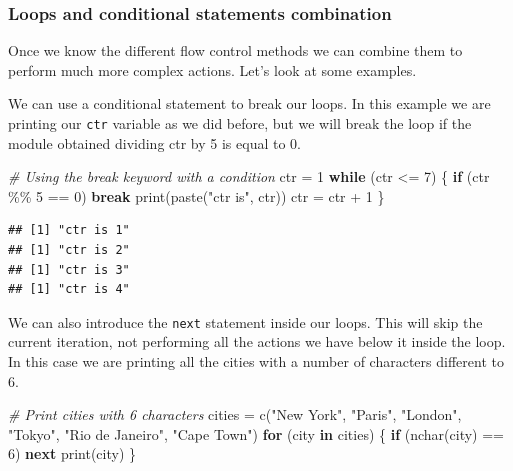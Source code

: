 \documentclass[
]{book}
\newenvironment{Shaded}{\begin{snugshade}}{\end{snugshade}}
\newcommand{\CommentTok}[1]{\textcolor[rgb]{0.56,0.35,0.01}{\textit{#1}}}
\newcommand{\ControlFlowTok}[1]{\textcolor[rgb]{0.13,0.29,0.53}{\textbf{#1}}}
\newcommand{\DecValTok}[1]{\textcolor[rgb]{0.00,0.00,0.81}{#1}}
\newcommand{\FunctionTok}[1]{\textcolor[rgb]{0.00,0.00,0.00}{#1}}
\newcommand{\NormalTok}[1]{#1}
\newcommand{\OtherTok}[1]{\textcolor[rgb]{0.56,0.35,0.01}{#1}}
\newcommand{\SpecialCharTok}[1]{\textcolor[rgb]{0.00,0.00,0.00}{#1}}
\newcommand{\StringTok}[1]{\textcolor[rgb]{0.31,0.60,0.02}{#1}}
\begin{document}
\hypertarget{loops-and-conditional-statements-combination}{%
\subsubsection{Loops and conditional statements combination}\label{loops-and-conditional-statements-combination}}

Once we know the different flow control methods we can combine them to perform much more complex actions. Let's look at some examples.

We can use a conditional statement to break our loops. In this example we are printing our \texttt{ctr} variable as we did before, but we will break the loop if the module obtained dividing ctr by 5 is equal to 0.

\begin{Shaded}
\begin{Highlighting}[]
\CommentTok{\# Using the break keyword with a condition}
\NormalTok{ctr }\OtherTok{=} \DecValTok{1}
\ControlFlowTok{while}\NormalTok{ (ctr }\SpecialCharTok{\textless{}=} \DecValTok{7}\NormalTok{) \{}
  \ControlFlowTok{if}\NormalTok{ (ctr }\SpecialCharTok{\%\%} \DecValTok{5} \SpecialCharTok{==} \DecValTok{0}\NormalTok{)}
    \ControlFlowTok{break}
  \FunctionTok{print}\NormalTok{(}\FunctionTok{paste}\NormalTok{(}\StringTok{"ctr is"}\NormalTok{, ctr))}
\NormalTok{  ctr }\OtherTok{=}\NormalTok{ ctr }\SpecialCharTok{+} \DecValTok{1}
\NormalTok{\}}
\end{Highlighting}
\end{Shaded}

\begin{verbatim}
## [1] "ctr is 1"
## [1] "ctr is 2"
## [1] "ctr is 3"
## [1] "ctr is 4"
\end{verbatim}

We can also introduce the \texttt{next} statement inside our loops. This will skip the current iteration, not performing all the actions we have below it inside the loop. In this case we are printing all the cities with a number of characters different to 6.

\begin{Shaded}
\begin{Highlighting}[]
\CommentTok{\# Print cities with 6 characters}
\NormalTok{cities }\OtherTok{=} \FunctionTok{c}\NormalTok{(}\StringTok{"New York"}\NormalTok{, }\StringTok{"Paris"}\NormalTok{, }\StringTok{"London"}\NormalTok{, }\StringTok{"Tokyo"}\NormalTok{, }\StringTok{"Rio de Janeiro"}\NormalTok{, }\StringTok{"Cape Town"}\NormalTok{)}
\ControlFlowTok{for}\NormalTok{ (city }\ControlFlowTok{in}\NormalTok{ cities) \{}
  \ControlFlowTok{if}\NormalTok{ (}\FunctionTok{nchar}\NormalTok{(city) }\SpecialCharTok{==} \DecValTok{6}\NormalTok{)}
    \ControlFlowTok{next}
  \FunctionTok{print}\NormalTok{(city)}
\NormalTok{\}}
\end{Highlighting}
\end{Shaded}
\end{document}
